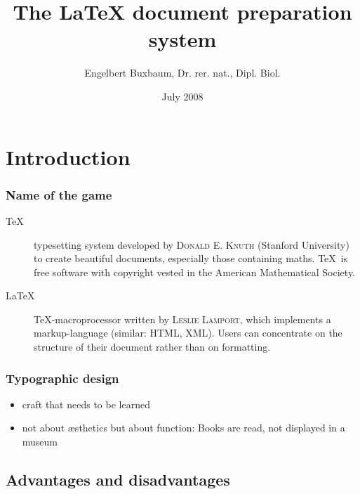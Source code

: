 \documentclass[presentation,hideothersubsections,final,10pt,american]{beamer}
\title[The \alert{\LaTeX} document preparation system]{The \alert{\LaTeX} document preparation system}
\author[E. Buxbaum]{Engelbert Buxbaum, {\tiny Dr. rer. nat., Dipl. Biol.}}
\date{July 2008}
\begin{document}
  {%
    \insertframenumber
  }

\frame{\titlepage}

\section{Introduction}

\begin{frame}
  \frametitle{Name of the game}
  \begin{description}
    \item[\TeX]{typesetting system developed by
        \textsc{Donald E. Knuth} (Stanford University) to
        create beautiful documents, especially those
        containing maths. \TeX\ is free software with
        copyright vested in the American Mathematical
        Society.}
    \item[\LaTeX]{\TeX -macroprocessor written by \textsc{Leslie
        Lamport}, which implements a markup-language (similar: HTML, XML). Users can
        concentrate on the structure of their document rather than on
        formatting.}
  \end{description}
\end{frame}

\begin{frame}
  \frametitle{Typographic design}
  \begin{itemize}
    \item{craft that needs to be learned}
    \item{not about æsthetics but about function: Books are
        read, not displayed in a museum}
  \end{itemize}
\end{frame}

\subsection{Advantages and disadvantages}
\end{document}

